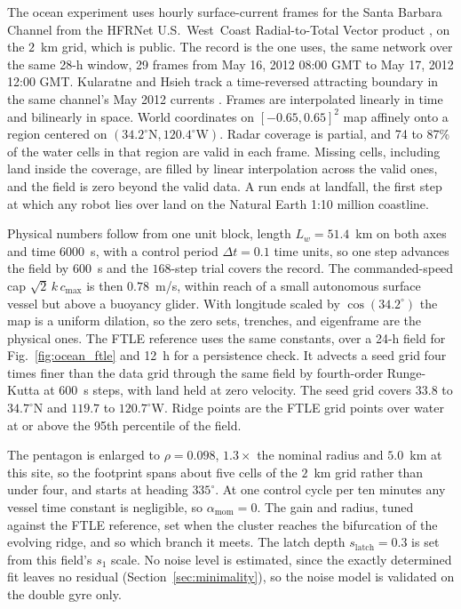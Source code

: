 \documentclass[lettersize,journal]{IEEEtran}
\begin{document}
The ocean experiment uses hourly surface-current frames for the Santa
Barbara Channel from the HFRNet U.S.~West~Coast Radial-to-Total Vector
product \cite{34,38}, on the $2$~km grid, which is public. The record is the one \cite{26} uses, the same network over the same 28-h window, 29 frames from May 16, 2012 08:00 GMT to May 17, 2012 12:00 GMT. Kularatne and Hsieh track a time-reversed attracting boundary in the same channel's May 2012 currents \cite{29}.
Frames are interpolated linearly in time and bilinearly in space. World
coordinates on $[-0.65, 0.65]^2$ map affinely onto a region centered on
$(34.2^{\circ}\mathrm{N}, 120.4^{\circ}\mathrm{W})$. Radar coverage is partial, and 74 to 87\%
of the water cells in that region are valid in each frame. Missing cells,
including land inside the coverage, are filled by linear interpolation
across the valid ones, and the field is zero beyond the valid data. A run
ends at landfall, the first step at which any robot lies over land on the
Natural Earth 1:10 million coastline.

Physical numbers follow from one unit block, length $L_w = 51.4$~km on
both axes and time $6000$~s, with a control period $\Delta t = 0.1$
time units, so one step advances the field by $600$~s and the
$168$-step trial covers the record. The commanded-speed cap
$\sqrt{2}\,k\,c_{\max}$ is then $0.78$~m/s, within reach of a small
autonomous surface vessel but above a buoyancy glider. With longitude
scaled by $\cos(34.2^{\circ})$ the map is a uniform dilation, so the zero
sets, trenches, and eigenframe are the physical ones. The FTLE reference
uses the same constants, over a 24-h field for Fig.~\ref{fig:ocean_ftle}
and 12~h for a persistence check. It advects a seed grid four times finer
than the data grid through the same field by fourth-order Runge-Kutta at
600~s steps, with land held at zero velocity. The seed grid covers $33.8$
to $34.7^{\circ}$N and $119.7$ to $120.7^{\circ}$W. Ridge points are the
FTLE grid points over water at or above the 95th percentile of the field.

The pentagon is enlarged to $\rho = 0.098$, $1.3\times$ the nominal radius
and $5.0$~km at this site, so the footprint spans about five cells of the
$2$~km grid rather than under four, and starts at heading $335^\circ$. At
one control cycle per ten minutes any vessel time constant is negligible,
so $\alpha_{\text{mom}} = 0$. The gain and radius, tuned
against the FTLE reference, set when the cluster
reaches the bifurcation of the evolving ridge, and so which branch it
meets. The latch depth $s_{\mathrm{latch}} = 0.3$ is set from this field's
$s_1$ scale. No
noise level is estimated, since the exactly determined fit leaves no
residual (Section~\ref{sec:minimality}), so the noise model is validated on the double gyre only.
\end{document}
